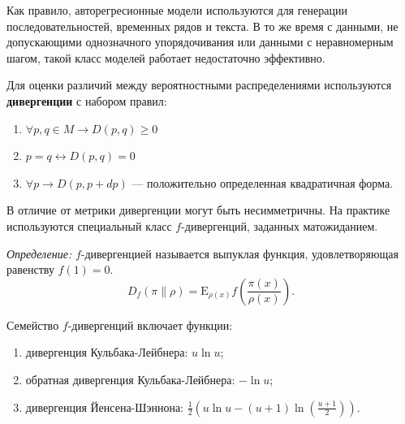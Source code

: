 Как правило, авторегресионные модели используются для генерации последовательностей, временных рядов и текста.
В то же время с данными, не допускающими однозначного упорядочивания или данными с неравномерным шагом, такой класс
моделей работает недостаточно эффективно.

Для оценки различий между вероятностными распределениями используются \textbf{дивергенции} с набором правил:
\begin{enumerate}
    \item $\forall p,q \in M \rightarrow D(p,q) \ge 0$  
    \item $p=q \leftrightarrow D(p,q) = 0$
    \item $\forall p \rightarrow D(p,p+dp)$ --- положительно определенная квадратичная форма.
\end{enumerate}

В отличие от метрики дивергенции могут быть несимметричны. На практике используются специальный класс $f$-дивергенций, заданных
 матожиданием.

\textit{Определение:} $f$-дивергенцией называется выпуклая функция, удовлетворяющая равенству $f(1)=0$.\:
$$
    D_f(\pi \parallel \rho) = \mathrm E_{\rho(x)} f\left(\frac{\pi(x)}{\rho(x)}\right).
$$

Семейство $f$-дивергенций включает функции:
\begin{enumerate}
    \item дивергенция Кульбака-Лейбнера: $u \ln u $;
    \item обратная дивергенция Кульбака-Лейбнера: $- \ln u$;
    \item дивергенция Йенсена-Шэннона: $\frac{1}{2}\left(u \ln u - (u+1) \ln(\frac{u+1}{2})\right)$.
\end{enumerate}

